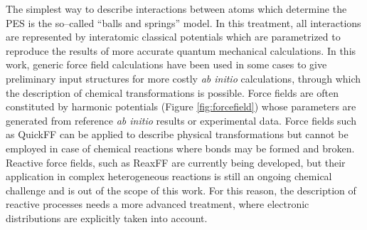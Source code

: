 The simplest way to describe interactions between atoms which determine the PES is the so--called ``balls and springs'' model. In this treatment, all interactions are represented by interatomic classical potentials which are parametrized to reproduce the results of more accurate quantum mechanical calculations. In this work, generic force field calculations have been used in some cases to give preliminary input structures for more costly \textit{ab initio} calculations, through which the description of chemical transformations is possible. 
Force fields are often constituted by harmonic potentials (Figure \ref{fig:forcefield}) whose parameters are generated from reference \textit{ab initio} results or experimental data. Force fields such as QuickFF \cite{vanduyfhuys2015quickff} can be applied to describe physical transformations but cannot be employed in case of chemical reactions where bonds may be formed and broken.
Reactive force fields, such as ReaxFF \cite{VanDuin2001} are currently being developed, but their application in complex heterogeneous reactions is still an ongoing chemical challenge and is out of the scope of this work. For this reason, the description of reactive processes needs a more advanced treatment, where electronic distributions are explicitly taken into account.

